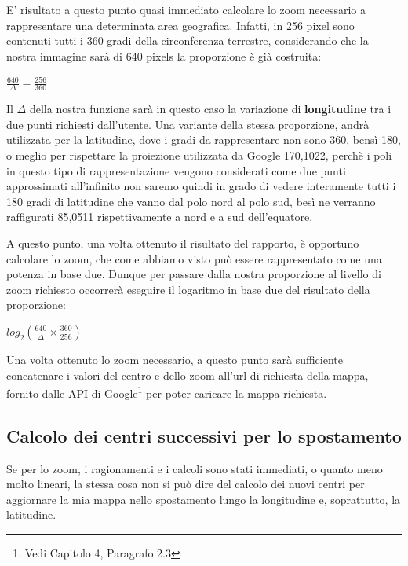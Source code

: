 E' risultato a questo punto quasi immediato calcolare lo zoom necessario a rappresentare una determinata area geografica. Infatti, in 256 pixel sono contenuti tutti i 360 gradi della circonferenza terrestre, considerando che la nostra immagine sarà di 640 pixels la proporzione è già costruita:
\begin{center}

	\LARGE$\frac{640}{\Delta} = \frac{256}{360} $\par

\end{center}
Il $\Delta$ della nostra funzione sarà in questo caso la variazione di \textbf{longitudine} tra i due punti richiesti dall'utente. Una variante della stessa proporzione, andrà utilizzata per la latitudine, dove i gradi da rappresentare non sono 360, bensì 180, o meglio per rispettare la proiezione utilizzata da Google 170,1022, perchè i poli in questo tipo di rappresentazione vengono considerati come due punti approssimati all'infinito non saremo quindi in grado di vedere interamente tutti i 180 gradi di latitudine che vanno dal polo nord al polo sud, besì ne verranno raffigurati 85,0511 rispettivamente a nord e a sud dell'equatore.

A questo punto, una volta ottenuto il risultato del rapporto, è opportuno calcolare lo zoom, che come abbiamo visto può essere rappresentato come una potenza in base due. Dunque per passare dalla nostra proporzione al livello di zoom richiesto occorrerà eseguire il logaritmo in base due del risultato della proporzione:
\begin{center}

	\Large$log_{2}(\frac{640}{\Delta}\times\frac{360}{256}) $\par

\end{center}

Una volta ottenuto lo zoom necessario, a questo punto sarà sufficiente concatenare i valori del centro e dello zoom all'url di richiesta della mappa, fornito dalle API di Google\footnote{Vedi Capitolo 4, Paragrafo 2.3} per poter caricare la mappa richiesta.

\subsection{Calcolo dei centri successivi per lo spostamento}
Se per lo zoom, i ragionamenti e i calcoli sono stati immediati, o quanto meno molto lineari, la stessa cosa non si può dire del calcolo dei nuovi centri per aggiornare la mia mappa nello spostamento lungo la longitudine e, soprattutto, la latitudine.

